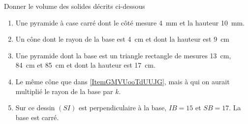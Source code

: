 
\begin{exercice}\label{exo2smath-0188}

    Donner le volume des solides décrits ci-dessous
    \begin{enumerate}
        \item
            Une pyramide à case carré dont le côté mesure \SI{4}{\milli\meter} et la hauteur \SI{10}{\milli\meter}.
        \item\label{ItemGMVUooTdUUJG}
            Un cône dont le rayon de la base est \SI{4}{\centi\meter} et dont la hauteur est \SI{9}{\centi\meter}
        \item
            Une pyramide dont la base est un triangle rectangle de mesures \SI{13}{\centi\meter}, \SI{84}{\centi\meter} et \SI{85}{\centi\meter} et dont la hauteur est \SI{17}{\centi\meter}.
        \item
            Le même cône que dans \ref{ItemGMVUooTdUUJG}, mais à qui on aurait multiplié le rayon de la base par \( k\).
        \item
            \begin{multicols}{2}
            Sur ce dessin \( (SI)\) est perpendiculaire à la base, \( IB=15\) et \( SB=17\). La base est carré.
            \columnbreak
\begin{center}                                                                                     
                                                    
\end{center}
            \end{multicols}
    \end{enumerate}

\end{exercice}
